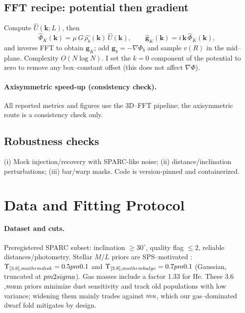 \documentclass[11pt,a4paper]{article}
\newcommand{\vect}[1]{\bm{#1}}
\newcommand{\Lmem}{L}       %
\newcommand{\gain}{\mu}     %
\newcommand{\rhob}{\rho_b}  %
\begin{document}
\subsection{FFT recipe: potential then gradient}\label{subsec:fft}
Compute $\widehat{U}(\vect{k};\Lmem)$, then
\[
\widehat{\Phi}_K(\vect{k})=\gain\,G\,\widehat{\rhob}(\vect{k})\,\widehat{U}(\vect{k}),
\qquad
\widehat{\vect{g}}_K(\vect{k})=i\,\vect{k}\,\widehat{\Phi}_K(\vect{k}),
\]
and inverse FFT to obtain $\vect{g}_K$; add $\vect{g}_b=-\nabla\Phi_b$ and sample $v(R)$ in the mid–plane. Complexity $O(N\log N)$. I set the $k=0$ component of the potential to zero to remove any box–constant offset (this does not affect $\nabla\Phi$).

\paragraph{Axisymmetric speed-up (consistency check).}
All reported metrics and figures use the 3D–FFT pipeline; the axisymmetric route is a consistency check only.

\subsection{Robustness checks}
(i) Mock injection/recovery with SPARC-like noise; (ii) distance/inclination perturbations; (iii) bar/warp masks. Code is version-pinned and containerized.

\section{Data and Fitting Protocol}\label{sec:methods}
\paragraph{Dataset and cuts.}
Preregistered SPARC subset: inclination $\ge 30^\circ$, quality flag $\le 2$, reliable distances/photometry. Stellar $M/L$ priors are SPS–motivated \citep{meidt2014mlr36,schombert2014cmlr}:
$\Upsilon_{[3.6],\\mathrm{disk}}=0.5\\pm0.1$ and
$\Upsilon_{[3.6],\\mathrm{bulge}}=0.7\\pm0.1$
(Gaussian, truncated at $\\pm2\\sigma$). Gas masses include a factor 1.33 for He.
These 3.6\\,$\\mu$m priors minimize dust sensitivity and track old populations with low variance;
widening them mainly trades against $\\mu$, which our gas–dominated dwarf fold mitigates by design.
\end{document}
